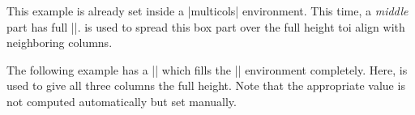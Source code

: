 \enlargethispage{\baselineskip}
\begin{dispListing}
\small
\begin{multicols}{2}
  \lipsum[1]
  \begin{tcolorbox}[enhanced jigsaw,breakable,size=title,
    colback=red!5!white,colframe=red!75!black,fonttitle=\bfseries,
    title=My breakable box,pad at break=1mm, break at=7.5cm/0pt ]
  \lipsum[2-4]
  \end{tcolorbox}
  \lipsum[4]
\end{multicols}
\end{dispListing}
{\tcbusetemp}

\clearpage

\begin{multicols}{2}
\small
This example is already set inside a |multicols| environment.
This time, a \emph{middle} part has full |\textheight|.
 is used to spread this box part over the full
height toi align with neighboring columns.
\begin{dispListing}
\lipsum[1]
\begin{tcolorbox}[enhanced jigsaw,breakable,
  size=title,
  colback=red!5!white,
  colframe=red!75!black,
  fonttitle=\bfseries,
  title=My breakable box,
  pad at break=2mm,
  break at=8.2cm/0pt,
  height fixed for=middle ]
\lipsum[2-7]
\end{tcolorbox}
\lipsum[8]
\end{dispListing}
{\tcbusetemp}
\end{multicols}


The following example has a |\tcolorbox| which fills the |\multicols|
environment completely. Here,  is used
to give all three columns the full height.
Note that the appropriate  value is not computed
automatically but set manually.

\begin{dispListing}
\small
\begin{multicols}{3}
  \begin{tcolorbox}[enhanced jigsaw,breakable,size=small,
    colback=red!5!white,colframe=red!75!black,fonttitle=\bfseries,
    title=My breakable box,pad at break=2mm,drop fuzzy shadow,
    height fixed for=all, break at=11.4cm ]
  \lipsum[1-3]
  \end{tcolorbox}
\end{multicols}
\end{dispListing}
{\tcbusetemp}


